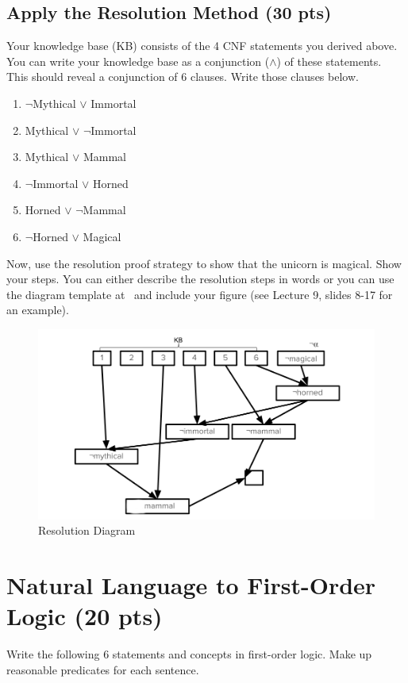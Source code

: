 \documentclass{article}
\begin{document}
\subsection{Apply the Resolution Method (30 pts)}
Your knowledge base (KB) consists of the 4 CNF statements you derived above. You can write your knowledge base as a conjunction ($\land$) of these statements. This should reveal a conjunction of 6 clauses. Write those clauses below.

\begin{enumerate}
    \item $\lnot$Mythical $\lor$ Immortal
    \item Mythical $\lor$ $\lnot$Immortal
    \item Mythical $\lor$ Mammal
    \item $\lnot$Immortal $\lor$ Horned
    \item Horned $\lor$ $\lnot$Mammal
    \item $\lnot$Horned $\lor$ Magical
\end{enumerate}

\noindent Now, use the resolution proof strategy to show that the unicorn is magical. Show your steps. You can either describe the resolution steps in words or you can use the diagram template at~\href{https://docs.google.com/drawings/d/1noR21Lkp1Hki2KK_N4lyy71ayVmQXB_O5x-d1EFviMg/edit?usp=sharing}{\color{blue}{HWs Public/HW2}} and include your figure (see Lecture 9, slides 8-17 for an example).

\begin{figure}
    \centering
    \includegraphics[scale=0.3]{figures/Resolution_Answer.png}
    \caption{Resolution Diagram}
    \label{fig:resolution}
\end{figure}

\section{Natural Language to First-Order Logic (20 pts)}
Write the following 6 statements and concepts in first-order logic. Make up reasonable predicates for each sentence.
\end{document}
